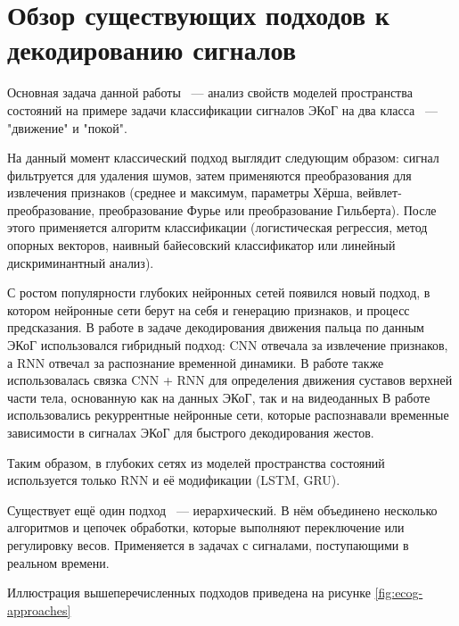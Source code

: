 \documentclass[a4paper, 12pt]{article}
\begin{document}
	\section{Обзор существующих подходов к декодированию сигналов}
	Основная задача данной работы ~--- анализ свойств моделей пространства состояний на примере задачи классификации сигналов ЭКоГ на два класса ~--- "движение" и "покой". 
	
	На данный момент классический подход выглядит следующим образом: сигнал фильтруется для удаления шумов, затем применяются преобразования для извлечения признаков (среднее и максимум, параметры Хёрша, вейвлет-преобразование, преобразование Фурье или преобразование Гильберта). После этого применяется алгоритм классификации (логистическая регрессия, метод опорных векторов, наивный байесовский классификатор или линейный дискриминантный анализ).
	
	С ростом популярности глубоких нейронных сетей появился новый подход, в котором нейронные сети берут на себя и генерацию признаков, и процесс предсказания.
	В работе \citep{xie2018decoding} в задаче декодирования движения пальца по данным ЭКоГ использовался гибридный подход: CNN отвечала за извлечение признаков, а RNN отвечал за распознание временной динамики.
	В работе \citep{wang2018ajile} также использовалась связка CNN + RNN для определения движения суставов верхней части тела, основанную как на данных ЭКоГ, так и на видеоданных
	В работе \citep{du2018decoding} использовались рекуррентные нейронные сети, которые распознавали временные зависимости в сигналах ЭКоГ для быстрого декодирования жестов.
	
	Таким образом, в глубоких сетях из моделей пространства состояний используется только RNN и её модификации (LSTM, GRU).
	
	Существует ещё один подход ~--- иерархический. В нём объединено несколько алгоритмов и цепочек обработки, которые выполняют переключение или регулировку весов. Применяется в задачах с сигналами, поступающими в реальном времени.
	
	Иллюстрация вышеперечисленных подходов приведена на рисунке \ref{fig:ecog-approaches}
	
\end{document}
